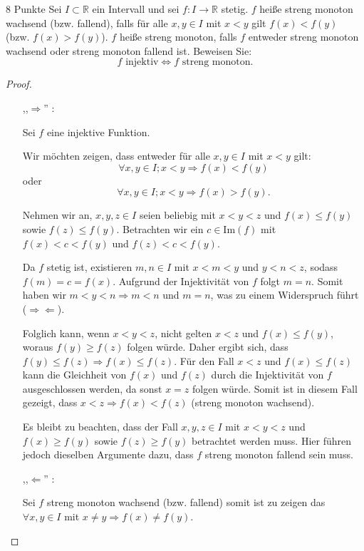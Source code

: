 \documentclass{problemset}
\begin{document}
\begin{problem}{8 Punkte}
Sei $I \subset \mathbb{R}$ ein Intervall und sei $f : I \to \mathbb{R}$ stetig. $f$ heiße streng monoton wachsend (bzw. fallend), falls für alle $x, y \in I$ mit $x < y$ gilt $f(x) < f(y)$ (bzw. $f(x) > f(y)$). $f$ heiße streng monoton, falls $f$ entweder streng monoton wachsend oder streng monoton fallend ist. Beweisen Sie:
\[f \text{ injektiv} \iff f \text{ streng monoton}.\]
\begin{proof}
	$ $

	\begin{itemize}
		\item [,,$\Longrightarrow$'']:

		      Sei $f$ eine injektive Funktion.

		      Wir möchten zeigen, dass entweder für alle $x, y \in I$ mit $x < y$ gilt:
		      \[
			      \forall x, y \in I; x < y \Rightarrow f(x) < f(y)
		      \]
		      oder
		      \[
			      \forall x, y \in I; x < y \Rightarrow f(x) > f(y).
		      \]

		      Nehmen wir an, $x, y, z \in I$ seien beliebig mit $x < y < z$ und $f(x) \leq f(y)$ sowie $f(z) \leq f(y)$.
		      Betrachten wir ein $c \in \text{Im}(f)$ mit $f(x) < c < f(y)$ und $f(z) < c < f(y)$.

		      Da $f$ stetig ist, existieren $m, n \in I$ mit $x < m < y$ und $y < n < z$, sodass $f(m) = c = f(x)$.
		      Aufgrund der Injektivität von $f$ folgt $m = n$.
		      Somit haben wir $m < y < n \Rightarrow m < n$ und $m = n$, was zu einem Widerspruch führt ($\Rightarrow\Leftarrow$).

		      Folglich kann, wenn $x < y < z$, nicht gelten $x < z$ und $f(x) \leq f(y)$, woraus $f(y) \geq f(z)$ folgen würde.
		      Daher ergibt sich, dass $f(y) \leq f(z) \Rightarrow f(x) \leq f(z)$.
		      Für den Fall $x < z$ und $f(x) \leq f(z)$ kann die Gleichheit von $f(x)$ und $f(z)$ durch die Injektivität von $f$ ausgeschlossen werden, da sonst $x = z$ folgen würde. Somit ist in diesem Fall gezeigt, dass $x < z \Rightarrow f(x) < f(z)$ (streng monoton wachsend).

		      Es bleibt zu beachten, dass der Fall $x, y, z \in I$ mit $x < y < z$ und $f(x) \geq f(y)$ sowie $f(z) \geq f(y)$ betrachtet werden muss. Hier führen jedoch dieselben Argumente dazu, dass $f$ streng monoton fallend sein muss.
		\item [,,$\Longleftarrow$'']:

		      Sei $f$ streng monoton wachsend (bzw. fallend) somit ist zu zeigen das $\forall x, y \in I$ mit $x \neq y \Rightarrow f(x) \ne f(y)$.


\end{itemize}
\end{proof}
\end{problem}
\end{document}
